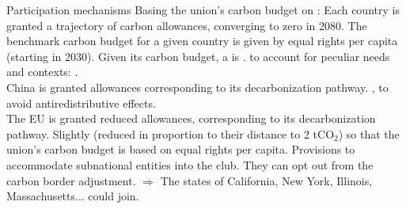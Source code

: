\documentclass[aspectratio=169,xcolor=dvipsnames, 11pt,mathserif]{beamer}
\begin{document}
\begin{framefont}{\small}
\begin{frame}{Participation mechanisms}
    \bbvsp 
    \ip Basing the union's carbon budget on :
    \bbvsp \ip Each country is granted a trajectory of carbon allowances, converging to zero in 2080.
        \ip The benchmark carbon budget for a given country is given by equal rights per capita (starting in 2030).
        \ip Given its carbon budget, a  is .
    \ee
    \ip {} to account for peculiar needs and contexts:
    \bbvsp \ip {}.
    \\ China is granted allowances corresponding to its decarbonization pathway.
    \ip {}, to avoid antiredistributive effects. 
    \\ The EU is granted reduced allowances, corresponding to its decarbonization pathway.
    \ip Slightly  (reduced in proportion to their distance to 2 tCO$_\text{2}$) so that the union's carbon budget is based on equal rights per capita.
        \ee
    \ip Provisions to accommodate subnational entities into the club.
    \bbvsp \ip They can opt out from the carbon border adjustment.
        \ip $\Rightarrow$ The states of California, New York, Illinois, Massachusetts... could join.%
        \ee
    \ee
\end{frame}


\end{framefont}
\end{document}
